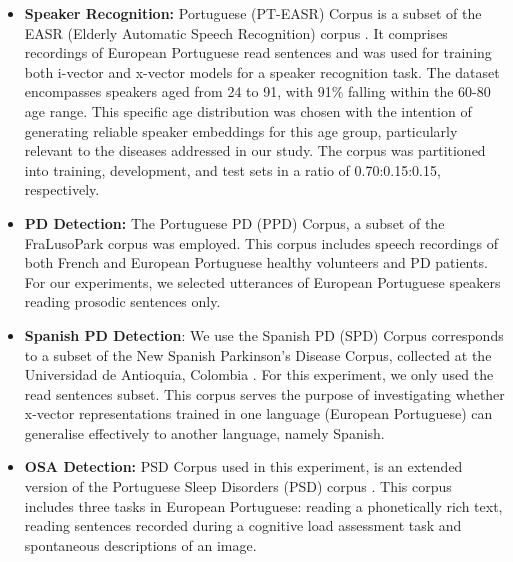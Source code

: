 \begin{itemize}
  \item \textbf{Speaker Recognition:} Portuguese (PT-EASR) Corpus is a subset of the EASR (Elderly Automatic Speech Recognition) corpus \cite{hamalainen2014easr}. It comprises recordings of European Portuguese read sentences and was used for training both i-vector and x-vector models for a speaker recognition task. The dataset encompasses speakers aged from 24 to 91, with 91\% falling within the 60-80 age range. This specific age distribution was chosen with the intention of generating reliable speaker embeddings for this age group, particularly relevant to the diseases addressed in our study. The corpus was partitioned into training, development, and test sets in a ratio of 0.70:0.15:0.15, respectively.

  \item \textbf{\ac{PD} Detection:} The Portuguese \ac{PD} (PPD) Corpus, a subset of the FraLusoPark corpus \cite{pinto2016dysarthria} was employed. This corpus includes speech recordings of both French and European Portuguese healthy volunteers and \ac{PD} patients. For our experiments, we selected utterances of European Portuguese speakers reading prosodic sentences only.

  \item \textbf{Spanish \ac{PD} Detection}: We use the Spanish \ac{PD} (SPD) Corpus corresponds to a subset of the New Spanish Parkinson’s Disease Corpus, collected at the Universidad de Antioquia, Colombia \cite{orozco2014new}. For this experiment, we only used the read sentences subset. This corpus serves the purpose of investigating whether x-vector representations trained in one language (European Portuguese) can generalise effectively to another language, namely Spanish.
  
  \item \textbf{ \ac{OSA} Detection:} PSD Corpus used in this experiment, is an extended version of the Portuguese Sleep Disorders (PSD) corpus \cite{botelho2019speech}. This corpus includes three tasks in European Portuguese: reading a phonetically rich text, reading sentences recorded during a cognitive load assessment task and spontaneous descriptions of an image. 
\end{itemize}


